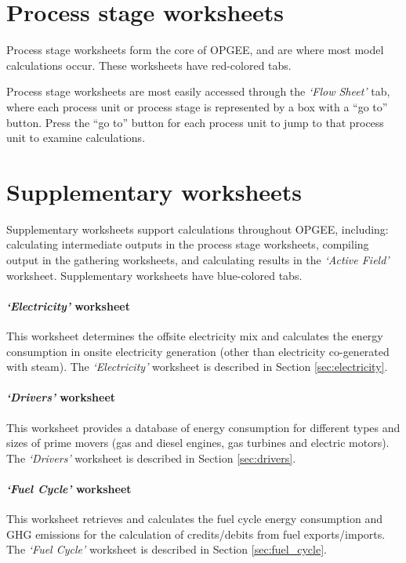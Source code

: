 \documentclass[11pt]{report}
\newcommand{\sheet}[1]{\textit{`{#1}'}}
\begin{document}
\clearpage

\section{Process stage worksheets}
Process stage worksheets form the core of OPGEE, and are where most model calculations occur. These worksheets have red-colored tabs.

Process stage worksheets are most easily accessed through the \sheet{Flow Sheet} tab, where each process unit or process stage is represented by a box with a ``go to'' button. Press the ``go to'' button for each process unit to jump to that process unit to examine calculations.

\clearpage

\section{Supplementary worksheets}

Supplementary worksheets support calculations throughout OPGEE, including: calculating intermediate outputs in the process stage worksheets, compiling output in the gathering worksheets, and calculating results in the \sheet{Active Field} worksheet. Supplementary worksheets have blue-colored tabs.

\paragraph{\sheet{Electricity} worksheet} This worksheet determines the offsite electricity mix and calculates the energy consumption in onsite electricity generation (other than electricity co-generated with steam). The \sheet{Electricity} worksheet is described in Section \ref{sec:electricity}.

\paragraph{\sheet{Drivers} worksheet} This worksheet provides a database of energy consumption for different types and sizes of prime movers (gas and diesel engines, gas turbines and electric motors). The \sheet{Drivers} worksheet is described in Section \ref{sec:drivers}.

\paragraph{\sheet{Fuel Cycle} worksheet} This worksheet retrieves and calculates the fuel cycle energy consumption and GHG emissions for the calculation of credits/debits from fuel exports/imports. The \sheet{Fuel Cycle} worksheet is described in Section \ref{sec:fuel_cycle}.
\end{document}
